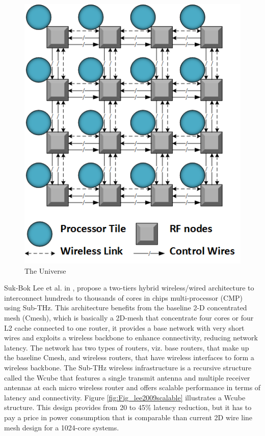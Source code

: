 \documentclass[12pt]{article}
\begin{document}
\begin{figure}[ht]
\centering
\includegraphics[scale=0.5]{Fig_4531729.png}
\caption{The Universe}
\label{fig:Fig_4531729}
\end{figure}

Suk-Bok Lee et al. in \citep{lee2009scalable}, propose a two-tiers hybrid wireless/wired architecture to interconnect hundreds to thousands of cores in chips multi-processor (CMP) using Sub-THz. This architecture benefits from the baseline 2-D concentrated mesh (Cmesh), which is basically a 2D-mesh that concentrate four cores or four L2 cache connected to one router, it provides a base network with very short wires and exploits a wireless backbone to enhance connectivity, reducing network latency. The network has two types of routers, viz. base routers, that make up the baseline Cmesh, and wireless routers, that have wireless interfaces to form a wireless backbone. The Sub-THz wireless infrastructure is a recursive structure called the Wcube that features a single transmit antenna and multiple receiver antennas at each micro wireless router and offers scalable performance in terms of latency and connectivity. Figure \ref{fig:Fig_lee2009scalable} illustrates a Wcube structure. This design provides from 20 to 45\% latency reduction, but it has to pay a price in power consumption that is comparable than current 2D wire line mesh design for a 1024-core systems.
\end{document}
